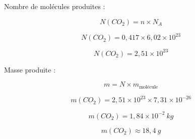 \documentclass[a4paper,11pt,fleqn]{scrartcl}
\begin{document}
\begin{enumerate}
    Nombre de molécules produites :

    \[
    N(CO_2)=n\times N_A
    \]

    \[
    N(CO_2)=0,417\times6,02\times10^{23}
    \]

    \[
    N(CO_2)=2,51\times10^{23}
    \]

    Masse produite :

    \[
    m=N\times m_{\text{molécule}}
    \]

    \[
    m(CO_2)=2,51\times10^{23}\times7,31\times10^{-26}
    \]

    \[
    m(CO_2)=1,84\times10^{-2}~kg
    \]

    \[
    m(CO_2)\approx18,4~g
    \]

\end{enumerate}
\end{document}
